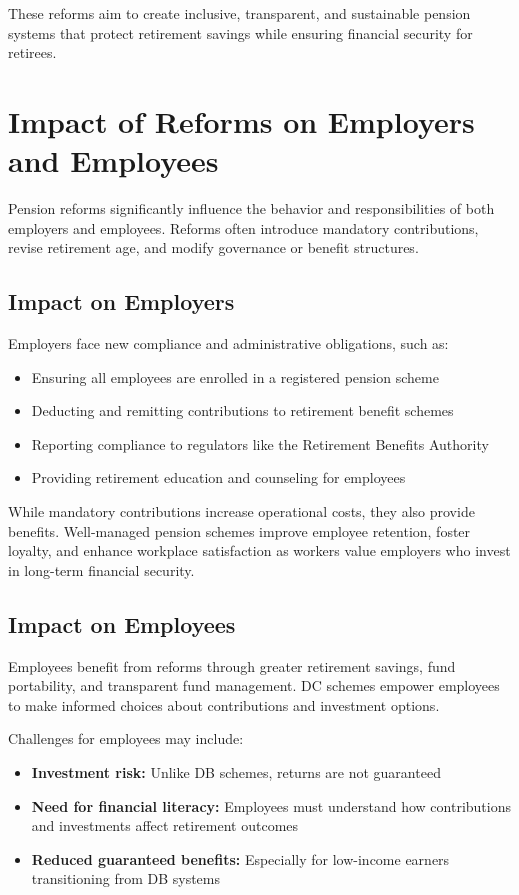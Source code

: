 \documentclass[12pt,a4paper]{article}
\begin{document}
These reforms aim to create inclusive, transparent, and sustainable pension systems that protect retirement savings while ensuring financial security for retirees.

\section{Impact of Reforms on Employers and Employees}

Pension reforms significantly influence the behavior and responsibilities of both employers and employees. Reforms often introduce mandatory contributions, revise retirement age, and modify governance or benefit structures.

\subsection{Impact on Employers}

Employers face new compliance and administrative obligations, such as:
\begin{itemize}
    \item Ensuring all employees are enrolled in a registered pension scheme
    \item Deducting and remitting contributions to retirement benefit schemes
    \item Reporting compliance to regulators like the Retirement Benefits Authority
    \item Providing retirement education and counseling for employees
\end{itemize}

While mandatory contributions increase operational costs, they also provide benefits. Well-managed pension schemes improve employee retention, foster loyalty, and enhance workplace satisfaction as workers value employers who invest in long-term financial security.

\subsection{Impact on Employees}

Employees benefit from reforms through greater retirement savings, fund portability, and transparent fund management. DC schemes empower employees to make informed choices about contributions and investment options.

Challenges for employees may include:
\begin{itemize}
    \item \textbf{Investment risk:} Unlike DB schemes, returns are not guaranteed
    \item \textbf{Need for financial literacy:} Employees must understand how contributions and investments affect retirement outcomes
    \item \textbf{Reduced guaranteed benefits:} Especially for low-income earners transitioning from DB systems
\end{itemize}
\end{document}

